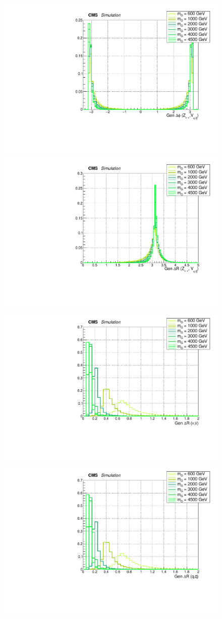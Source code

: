  \begin{figure}[!htb]
   \begin{center}
     \includegraphics[width=.495\textwidth]{Gen_v9/XZZInv_g_VZDPhi.pdf}%
     \includegraphics[width=.495\textwidth]{Gen_v9/XZZInv_g_VZDR.pdf}%
     \\
     \includegraphics[width=.495\textwidth]{Gen_v9/XZZInv_g_LepDR.pdf}%
     \includegraphics[width=.495\textwidth]{Gen_v9/XZZInv_g_HadDR.pdf}%
     \\

\end{center}
\end{figure}
